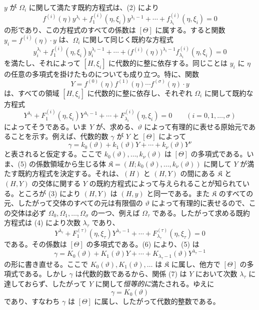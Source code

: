 $y$ が $\Omega_i$ に関して満たす既約方程式は、(2) により
\[
 f^{(i)}(\eta)y^{\lambda_i}+f_1^{(i)}(\eta,\xi_i)y^{\lambda_i-1}
+\cdots+f_{\lambda_i}^{(i)}(\eta,\xi_i)=0
\]
の形であり、この方程式のすべての係数は $[\Theta]$ に属する。すると関数 $y_i=f^{(i)}(\eta)\cdot y$ は、$\Omega_i$ に関して同じく既約な方程式
\[
 y_i^{\lambda_i}+f_1^{(i)}(\eta,\xi_i)y_i^{\lambda_i-1}
+\cdots+\bigl(f^{(i)}(\eta)\bigr)^{\lambda_i-1}
 f_{\lambda_i}^{(i)}(\eta,\xi_i)=0
\]
を満たし、それによって $[H,\xi_i]$ に代数的に整に依存する。同じことは $y_i$ に $\eta$ の任意の多項式を掛けたものについても成り立つ。特に、関数
\begin{equation}
Y=f^{(0)}(\eta)f^{(1)}(\eta)\cdots f^{(\sigma)}(\eta)\cdot y
\tag{3}
\end{equation}
は、すべての領域 $[H,\xi_i]$ に代数的に整に依存し、それぞれ $\Omega_i$ に関して既約な方程式
\begin{equation}
Y^{\lambda_i}+F_1^{(i)}(\eta,\xi_i)Y^{\lambda_i-1}
+\cdots+F_{\lambda_i}^{(i)}(\eta,\xi_i)=0
\qquad (i=0,1,\ldots,\sigma)
\tag{4}
\end{equation}
によってそうである。いま $Y$ が、求める、$\vartheta$ によって有理的に表せる原始元であることを示す。例えば、代数的数 $\gamma$ が $Y$ と $[\Theta]$ によって
\begin{equation}
\gamma=k_0(\vartheta)+k_1(\vartheta)Y+\cdots+k_\nu(\vartheta)Y^\nu
\tag{5}
\end{equation}
と表されると仮定する。ここで $k_0(\vartheta),\ldots,k_\nu(\vartheta)$ は $[\Theta]$ の多項式である。いま、(5) の係数領域から生じる体 $\mathfrak K=(H;k_0(\vartheta),\ldots,k_\nu(\vartheta))$ に関して $Y$ が満たす既約方程式を決定する。それは、$(H)$ と $(H,Y)$ の間にある $\mathfrak K$ と $(H,Y)$ の交体に関する $Y$ の既約方程式によって与えられることが知られている。ところが (3) により $(H,Y)$ は $(H,y)$ と同一である。また $\mathfrak K$ のすべての元、したがって交体のすべての元は有限個の $\vartheta$ によって有理的に表せるので、この交体は必ず $\Omega_0,\Omega_1,\ldots,\Omega_\sigma$ の一つ、例えば $\Omega_\tau$ である。したがって求める既約方程式は (4) により次数 $\lambda_\tau$ であり、
\begin{equation}
Y^{\lambda_\tau}+F_1^{(\tau)}(\eta,\xi_\tau)Y^{\lambda_\tau-1}
+\cdots+F_{\lambda_\tau}^{(\tau)}(\eta,\xi_\tau)=0
\tag{6}
\end{equation}
である。その係数は $[\Theta]$ の多項式である。(6) により、(5) は
\begin{equation}
\gamma=K_0(\vartheta)+K_1(\vartheta)Y+\cdots+
K_{\lambda_\tau-1}(\vartheta)Y^{\lambda_\tau-1}
\tag{7}
\end{equation}
の形に書き直せる。ここで $K_0(\vartheta),K_1(\vartheta),\ldots$ は $\mathfrak K$ に属し、他方で $[\Theta]$ の多項式である。しかし $\gamma$ は代数的数であるから、関係 (7) は $Y$ において次数 $\lambda_\tau$ に達しておらず、したがって $Y$ に関して\emph{恒等的に}満たされる。ゆえに
\[
 \gamma=K_0(\vartheta)
\]
であり、すなわち $\gamma$ は $[\Theta]$ に属し、したがって代数的整数である。

